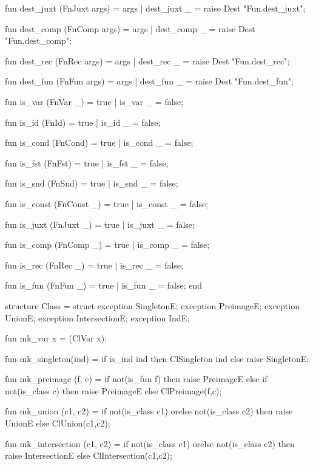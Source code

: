 fun dest_juxt (FnJuxt args) = args
  | dest_juxt _ = raise Dest "Fun.dest_juxt";

fun dest_comp (FnComp args) = args
  | dest_comp _ = raise Dest "Fun.dest_comp";

fun dest_rec (FnRec args) = args
  | dest_rec _ = raise Dest "Fun.dest_rec";

fun dest_fun (FnFun args) = args
  | dest_fun _ = raise Dest "Fun.dest_fun";

fun is_var (FnVar _) = true
  | is_var _ = false;

fun is_id (FnId) = true
  | is_id _ = false;

fun is_cond (FnCond) = true
  | is_cond _ = false;

fun is_fst (FnFst) = true
  | is_fst _ = false;

fun is_snd (FnSnd) = true
  | is_snd _ = false;

fun is_const (FnConst _) = true
  | is_const _ = false;

fun is_juxt (FnJuxt _) = true
  | is_juxt _ = false;

fun is_comp (FnComp _) = true
  | is_comp _ = false;

fun is_rec (FnRec _) = true
  | is_rec _ = false;

fun is_fun (FnFun _) = true
  | is_fun _ = false;
end
\nwendcode{}\nwdocspar

\nwenddocs{}\endmoddef\nwstartdeflinemarkup{}\nwenddeflinemarkup
structure Class = struct
exception SingletonE;
exception PreimageE;
exception UnionE;
exception IntersectionE;
exception IndE;

fun mk_var x = (ClVar x);

fun mk_singleton(ind) = if is_ind ind then ClSingleton ind
                        else raise SingletonE;

fun mk_preimage (f, c) =
  if not(is_fun f) then raise PreimageE
  else if not(is_class c) then raise PreimageE
  else ClPreimage(f,c);

fun mk_union (c1, c2) =
  if not(is_class c1) orelse not(is_class c2)
  then raise UnionE
  else ClUnion(c1,c2);

fun mk_intersection (c1, c2) =
  if not(is_class c1) orelse not(is_class c2)
  then raise IntersectionE
  else ClIntersection(c1,c2);

